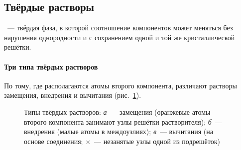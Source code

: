 \subsection{Твёрдые растворы}\label{ssec:solid-sol}

\begin{opredelenie}
~— твёрдая фаза, в которой соотношение
компонентов может меняться без нарушения однородности и с сохранением
одной и той же кристаллической решётки.
\end{opredelenie}

\paragraph{Три типа твёрдых растворов}
По тому, где располагаются атомы второго компонента, различают растворы
замещения, внедрения и вычитания (рис.~\ref{fig:ss-types}).

\begin{figure}[ht]
\centering
{}
\caption{Типы твёрдых растворов: \textit{а}~— замещения (оранжевые
атомы второго компонента занимают узлы решётки растворителя);
\textit{б}~— внедрения (малые атомы в междоузлиях); \textit{в}~—
вычитания (на основе соединения; $\times$~— незанятые узлы одной из
подрешёток)}
\label{fig:ss-types}
\end{figure}

